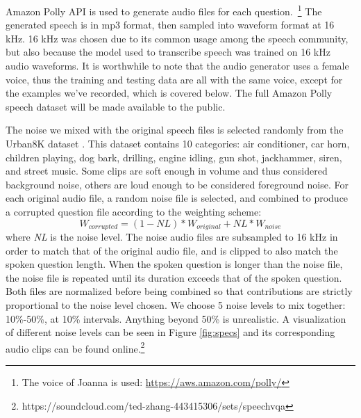 \documentclass[letterpaper]{article} %
\begin{document}
Amazon Polly API is used to generate audio files for each question.~\footnote{The voice of Joanna is used: \url{https://aws.amazon.com/polly/}} The generated speech is in mp3 format, then sampled into waveform format at 16 kHz. 16 kHz was chosen due to its common usage among the speech community, but also because the model used to transcribe speech was trained on 16 kHz audio waveforms. It is worthwhile to note that the audio generator uses a female voice, thus the training and testing data are all with the same voice, except for the examples we’ve recorded, which is covered below. The full Amazon Polly speech dataset will be made available to the public.

The noise we mixed with the original speech files is selected randomly from the Urban8K dataset . This dataset contains 10 categories: air conditioner, car horn, children playing, dog bark, drilling, engine idling, gun shot, jackhammer, siren, and street music. Some clips are soft enough in volume and thus considered background noise, others are loud enough to be considered foreground noise. For each original audio file, a random noise file is selected, and combined to produce a corrupted question file according to the weighting scheme:
\begin{displaymath}
  W_{corrupted} = (1-\mathit{NL})*W_{original}  + \mathit{NL}*W_{noise}
\end{displaymath}
where \textit{NL} is the noise level. The noise audio files are subsampled to 16 kHz in order to match that of the original audio file, and is clipped to also match the spoken question length. When the spoken question is longer than the noise file, the noise file is repeated until its duration exceeds that of the spoken question. Both files are normalized before being combined so that contributions are strictly proportional to the noise level chosen. We choose 5 noise levels to mix together: 10\%-50\%, at 10\% intervals. Anything beyond 50\% is unrealistic. A visualization of different noise levels can be seen in Figure \ref{fig:specs} and its corresponding audio clips can be found online.\footnote{https://soundcloud.com/ted-zhang-443415306/sets/speechvqa}
\end{document}

